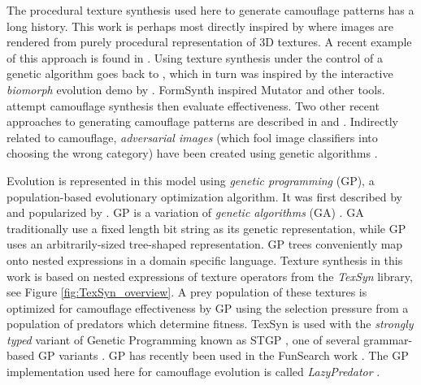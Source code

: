 \documentclass[letterpaper]{article}
\newcommand{\jargon}[1]{\textit{#1}}
\newcommand{\texsyn}[0]{TexSyn}
\newcommand{\lazypredator}[0]{LazyPredator}
\begin{document}
\par
The procedural texture synthesis used here to generate camouflage patterns has a long history. This work is perhaps most directly inspired by \citet{perlin_image_1985} where images are rendered from purely procedural representation of 3D textures. A recent example of this approach is found in \citet{Guerrero_MatFormer_2022}. Using texture synthesis under the control of a genetic algorithm goes back to \citet{sims_artificial_1991}, which in turn was inspired by the interactive \jargon{biomorph} evolution demo by \citet{dawkins_blind_1986}. FormSynth \citep{latham_form_1989} inspired Mutator \citep{todd_evolutionary_1994} and other tools. \citet{troscianko_quantifying_2017} attempt camouflage synthesis then evaluate effectiveness. Two other recent approaches to generating camouflage patterns are described in \citet{xiuxia_imitation_2023} and \citet{zhang_spatial_2013}. Indirectly related to camouflage, \textit{adversarial images} (which fool image classifiers into choosing the wrong category) have been created using genetic algorithms  \citep{bradley_generation_2023}. 
\par
Evolution is represented in this model using \jargon{genetic programming} (GP), a population-based evolutionary optimization algorithm. It was first described by \citet{cramer_representation_1985} and popularized by \citet{koza_genetic_1992}. GP is a variation of \jargon{genetic algorithms} (GA) \citep{holland_genetic_1984}. GA traditionally use a fixed length bit string as its genetic representation, while GP uses an arbitrarily-sized tree-shaped representation. GP trees conveniently map onto nested expressions in a domain specific language. Texture synthesis in this work is based on nested expressions of texture operators from the \jargon{\texsyn{}} library, see Figure \ref{fig:TexSyn_overview}. A prey population of these textures is optimized for camouflage effectiveness by GP using the selection pressure from a population of predators which determine fitness. \texsyn{} is used with the \jargon{strongly typed} variant of Genetic Programming known as STGP \citep{montana_strongly_1995}, one of several grammar-based GP variants \citep{Mckay_2010}. GP has recently been used in the FunSearch work \citep{romera-paredes_mathematical_2023}. The GP implementation used here for camouflage evolution is called \jargon{\lazypredator{}} \citep{reynolds_lazypredator_2020}.
\par
\end{document}
